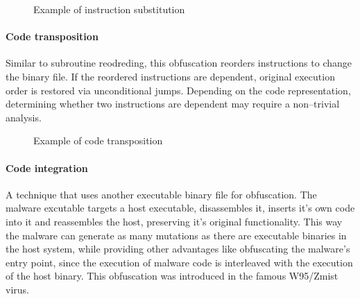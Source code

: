 \begin{figure}[H]
    \centering
    \caption{Example of instruction substitution}
    \label{fig_obf_instrsub}
\end{figure}

\paragraph*{Code transposition}
Similar to subroutine reodreding, this obfuscation reorders instructions to change the binary file. If the reordered instructions are dependent, original execution order is restored via unconditional jumps. Depending on the code representation, determining whether two instructions are dependent may require a non--trivial analysis.

\begin{figure}[H]
    \centering
    \caption{Example of code transposition}
    \label{fig_obf_trans}
\end{figure}

\paragraph*{Code integration}
A technique that uses another executable binary file for obfuscation. The malware excutable targets a host executable, disassembles it, inserts it's own code into it and reassembles the host, preserving it's original functionality. This way the malware can generate as many mutations as there are executable binaries in the host system, while providing other advantages like obfuscating the malware's entry point, since the execution of malware code is interleaved with the execution of the host binary. This obfuscation was introduced in the famous W95/Zmist virus.

